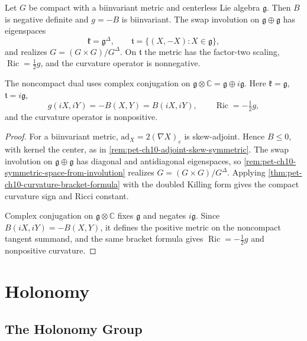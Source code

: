 \begin{example}
  \label{ex:pet-ch10-lie-group-symmetric}

  Let $G$ be compact with a biinvariant metric and centerless Lie algebra
  $\mathfrak g$. Then $B$ is negative definite and $g=-B$ is biinvariant. The
  swap involution on $\mathfrak g\oplus\mathfrak g$ has eigenspaces
  \[
    \mathfrak k=\mathfrak g^\Delta,
    \qquad \mathfrak t=\{(X,-X):X\in\mathfrak g\},
  \]
  and realizes $G=(G\times G)/G^\Delta$. On $\mathfrak t$ the metric has the
  factor-two scaling, $\operatorname{Ric}=\tfrac12g$, and the curvature operator
  is nonnegative.

  The noncompact dual uses complex conjugation on
  $\mathfrak g\otimes\mathbb C=\mathfrak g\oplus i\mathfrak g$. Here
  $\mathfrak k=\mathfrak g$, $\mathfrak t=i\mathfrak g$,
  \[
    g(iX,iY)=-B(X,Y)=B(iX,iY),\qquad
    \operatorname{Ric}=-\tfrac12g,
  \]
  and the curvature operator is nonpositive.
\end{example}
\begin{proof}
  \sketch
  For a biinvariant metric, $\mathrm{ad}_X=2(\nabla X)_e$ is skew-adjoint.
  Hence $B\le0$, with kernel the center, as in
  \cref{rem:pet-ch10-adjoint-skew-symmetric}. The swap involution on
  $\mathfrak g\oplus\mathfrak g$ has diagonal and antidiagonal eigenspaces, so
  \cref{rem:pet-ch10-symmetric-space-from-involution} realizes
  $G=(G\times G)/G^\Delta$. Applying
  \cref{thm:pet-ch10-curvature-bracket-formula} with the doubled Killing form
  gives the compact curvature sign and Ricci constant.

  Complex conjugation on $\mathfrak g\otimes\mathbb C$ fixes $\mathfrak g$ and
  negates $i\mathfrak g$. Since $B(iX,iY)=-B(X,Y)$, it defines the positive
  metric on the noncompact tangent summand, and the same bracket formula gives
  $\operatorname{Ric}=-\tfrac12g$ and nonpositive curvature.
\end{proof}

\section{Holonomy}

\subsection{The Holonomy Group}

